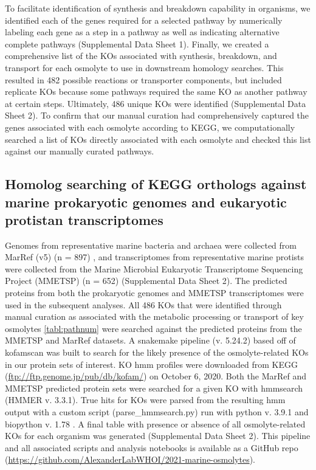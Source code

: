 \documentclass[utf8]{frontiersSCNS} %
\begin{document}
To facilitate identification of synthesis and breakdown capability in organisms, we identified each of the genes required for a selected pathway by numerically labeling each gene as a step in a pathway as well as indicating alternative complete pathways (Supplemental Data Sheet 1). Finally, we created a comprehensive list of the KOs associated with synthesis, breakdown, and transport for each osmolyte to use in downstream homology searches. This resulted in 482 possible reactions or transporter components, but included replicate KOs because some pathways required the same KO as another pathway at certain steps. Ultimately, 486 unique KOs were identified (Supplemental Data Sheet 2). To confirm that our manual curation had comprehensively captured the genes associated with each osmolyte according to KEGG, we computationally searched a list of KOs directly associated with each osmolyte and checked this list against our manually curated pathways.

\subsection{Homolog searching of KEGG orthologs against marine prokaryotic genomes and eukaryotic protistan transcriptomes}

Genomes from representative marine bacteria and archaea were collected from MarRef (v5) (n = 897) \citep{ten_Hoopen_2017,Klemetsen_2017}, and transcriptomes from representative marine protists were collected from the Marine Microbial Eukaryotic Transcriptome Sequencing Project (MMETSP) (n = 652) \citep{Johnson_2018, Keeling_2014} (Supplemental Data Sheet 2). The predicted proteins from both the prokaryotic genomes and MMETSP transcriptomes were used in the subsequent analyses. All 486 KOs that were identified through manual curation as associated with the metabolic processing or transport of key osmolytes \ref{tabl:pathnum} were searched against the predicted proteins from the MMETSP and MarRef datasets. A snakemake pipeline (v. 5.24.2) \citep{M_lder_2021} based off of kofamscan \citep{Aramaki_2019, Mistry_2013} was built to search for the likely presence of the osmolyte-related KOs in our protein sets of interest. KO hmm profiles were downloaded from KEGG (\url{ftp://ftp.genome.jp/pub/db/kofam/}) on October 6, 2020. Both the MarRef and MMETSP predicted protein sets were searched for a given KO with hmmsearch (HMMER v. 3.3.1). True hits for KOs were parsed from the resulting hmm output with a custom script (parse\_hmmsearch.py) run with python v. 3.9.1 and biopython v. 1.78 \citep{Cock_2009}. A final table with presence or absence of all osmolyte-related KOs for each organism was generated (Supplemental Data Sheet 2). This pipeline and all associated scripts and analysis notebooks is available as a GitHub repo (\url{https://github.com/AlexanderLabWHOI/2021-marine-osmolytes}). 
\end{document}
